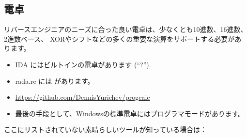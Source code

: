 \subsection{電卓}

リバースエンジニアのニーズに合った良い電卓は、少なくとも10進数、16進数、2進数ベース、
XORやシフトなどの多くの重要な演算をサポートする必要があります。

\begin{itemize}

\item IDA にはビルトインの電卓があります (``?'').

\item rada.re には があります。

\item \url{https://github.com/DennisYurichev/progcalc}

\item 最後の手段として、Windowsの標準電卓にはプログラマモードがあります。

\end{itemize}


ここにリストされていない素晴らしいツールが知っている場合は：\\
\TT{\EMAIL}
